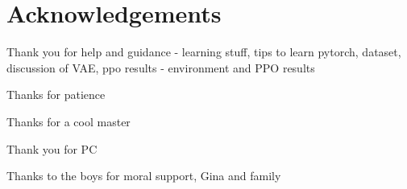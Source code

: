 \chapter*{Acknowledgements}

Thank you for help and guidance
- learning stuff, tips to learn pytorch, dataset, discussion of VAE, ppo results
- environment and PPO results


Thanks for patience

Thanks for a cool master

Thank you for PC

Thanks to the boys for moral support, Gina and family